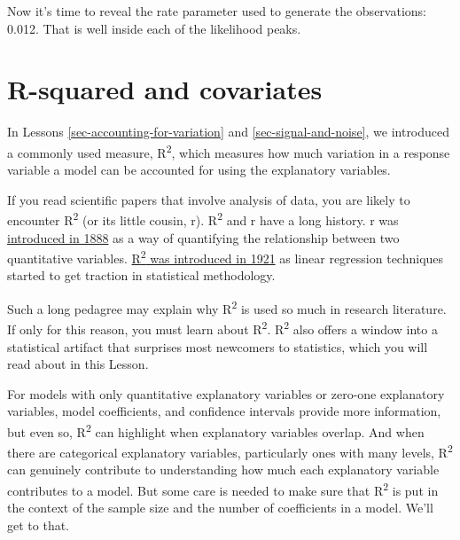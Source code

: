 \documentclass[
  letterpaper,
  DIV=11,
  numbers=noendperiod,
  oneside]{scrartcl}
\begin{document}
Now it's time to reveal the rate parameter used to generate the
observations: 0.012. That is well inside each of the likelihood peaks.

\newpage

\section{R-squared and covariates}\label{sec-R2}

In Lessons \ref{sec-accounting-for-variation} and
\ref{sec-signal-and-noise}, we introduced a commonly used measure,
R\textsuperscript{2}, which measures how much variation in a response
variable a model can be accounted for using the explanatory variables.

\begin{tcolorbox}[enhanced jigsaw, colbacktitle=quarto-callout-note-color!10!white, opacityback=0, breakable, opacitybacktitle=0.6, colback=white, coltitle=black, arc=.35mm, title=\textcolor{quarto-callout-note-color}{\faInfo}\hspace{0.5em}{Do we need R\textsuperscript{2}?}, left=2mm, colframe=quarto-callout-note-color-frame, rightrule=.15mm, bottomrule=.15mm, leftrule=.75mm, bottomtitle=1mm, toptitle=1mm, titlerule=0mm, toprule=.15mm]

If you read scientific papers that involve analysis of data, you are
likely to encounter R\textsuperscript{2} (or its little cousin, r).
R\textsuperscript{2} and r have a long history. r was
\href{https://royalsocietypublishing.org/doi/10.1098/rspl.1888.0082}{introduced
in 1888} as a way of quantifying the relationship between two
quantitative variables.
\href{https://www.google.com/books/edition/Journal_of_Agricultural_Research/CWw4AQAAMAAJ?hl=en&gbpv=1&bsq=sewall}{R\textsuperscript{2}
was introduced in 1921} as linear regression techniques started to get
traction in statistical methodology.

Such a long pedagree may explain why R\textsuperscript{2} is used so
much in research literature. If only for this reason, you must learn
about R\textsuperscript{2}. R\textsuperscript{2} also offers a window
into a statistical artifact that surprises most newcomers to statistics,
which you will read about in this Lesson.

For models with only quantitative explanatory variables or zero-one
explanatory variables, model coefficients, and confidence intervals
provide more information, but even so, R\textsuperscript{2} can
highlight when explanatory variables overlap. And when there are
categorical explanatory variables, particularly ones with many levels,
R\textsuperscript{2} can genuinely contribute to understanding how much
each explanatory variable contributes to a model. But some care is
needed to make sure that R\textsuperscript{2} is put in the context of
the sample size and the number of coefficients in a model. We'll get to
that.

\end{tcolorbox}
\end{document}
